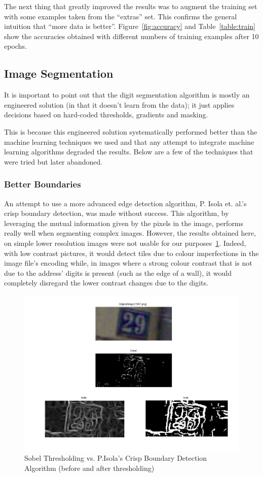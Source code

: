 \documentclass{article} %
\begin{document}
The next thing that greatly improved the results was to augment the training set with some examples taken from the “extras” set. This confirms the general intuition that “more data is better”.  Figure~\ref{fig:accuracy} and Table~\ref{table:train} show the accuracies obtained with different numbers of training examples after 10 epochs.

\subsection{Image Segmentation}

It is important to point out that the digit segmentation algorithm is mostly an engineered solution (in that it doesn’t learn from the data); it just applies decisions based on hard-coded thresholds, gradients and masking.

This is because this engineered solution systematically performed better than the machine learning techniques we used and that any attempt to integrate machine learning algorithms degraded the results. Below are a few of the techniques that were tried but later abandoned.

\subsubsection{Better Boundaries}
An attempt to use a more advanced edge detection algorithm, P. Isola et. al.’s crisp boundary detection\cite{isola2014crisp}, was made without success. This algorithm, by leveraging the mutual information given by the pixels in the image, performs really well when segmenting complex images. However, the results obtained here, on simple lower resolution images were not usable for our purposes~\ref{fig:isola}. Indeed, with low contrast pictures, it would detect tiles due to colour imperfections in the image file’s encoding while, in images where a strong colour contrast that is not due to the address’ digits is present (such as the edge of a wall), it would completely disregard the lower contrast changes due to the digits.

\begin{center}
\begin{figure}[!htb]
  \includegraphics[width=0.8\linewidth]{image09}
  \caption{Sobel Thresholding vs. P.Isola's Crisp Boundary Detection Algorithm (before and after thresholding)}
  \label{fig:isola}
\end{figure}
\end{center}
\end{document}
